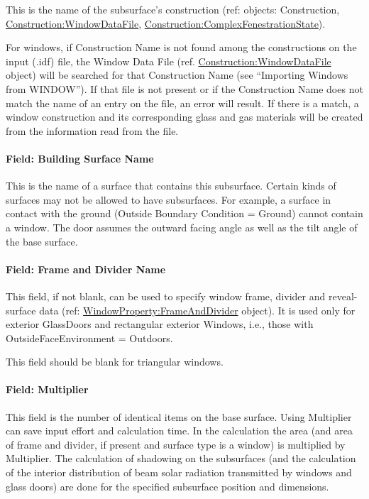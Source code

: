This is the name of the subsurface's construction (ref: objects: Construction, \hyperref[constructionwindowdatafile]{Construction:WindowDataFile}, \hyperref[constructioncomplexfenestrationstate]{Construction:ComplexFenestrationState}).

For windows, if Construction Name is not found among the constructions on the input (.idf) file, the Window Data File (ref. \hyperref[constructionwindowdatafile]{Construction:WindowDataFile} object) will be searched for that Construction Name (see ``Importing Windows from WINDOW''). If that file is not present or if the Construction Name does not match the name of an entry on the file, an error will result. If there is a match, a window construction and its corresponding glass and gas materials will be created from the information read from the file.

\paragraph{Field: Building Surface Name}\label{field-building-surface-name-2}

This is the name of a surface that contains this subsurface. Certain kinds of surfaces may not be allowed to have subsurfaces. For example, a surface in contact with the ground (Outside Boundary Condition = Ground) cannot contain a window. The door assumes the outward facing angle as well as the tilt angle of the base surface.

\paragraph{Field: Frame and Divider Name}\label{field-frame-and-divider-name-1}

This field, if not blank, can be used to specify window frame, divider and reveal-surface data (ref: \hyperref[windowpropertyframeanddivider]{WindowProperty:FrameAndDivider} object). It is used only for exterior GlassDoors and rectangular exterior Windows, i.e., those with OutsideFaceEnvironment = Outdoors.

This field should be blank for triangular windows.

\paragraph{Field: Multiplier}\label{field-multiplier-3}

This field is the number of identical items on the base surface. Using Multiplier can save input effort and calculation time. In the calculation the area (and area of frame and divider, if present and surface type is a window) is multiplied by Multiplier. The calculation of shadowing on the subsurfaces (and the calculation of the interior distribution of beam solar radiation transmitted by windows and glass doors) are done for the specified subsurface position and dimensions.

